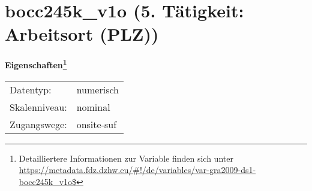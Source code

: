 
    \setcounter{footnote}{0}

    \vspace*{-1.8cm}
	\section{bocc245k\_v1o (5. Tätigkeit: Arbeitsort (PLZ))}
	\label{section:bocc245k_v1o}



    \vspace*{0.5cm}
    \noindent\textbf{Eigenschaften\footnote{Detailliertere Informationen zur Variable finden sich unter
		\url{https://metadata.fdz.dzhw.eu/\#!/de/variables/var-gra2009-ds1-bocc245k_v1o$}}}\\
	\begin{tabularx}{\hsize}{@{}lX}
	Datentyp: & numerisch \\
	Skalenniveau: & nominal \\
	Zugangswege: &
	  onsite-suf
 \\
    \end{tabularx}



